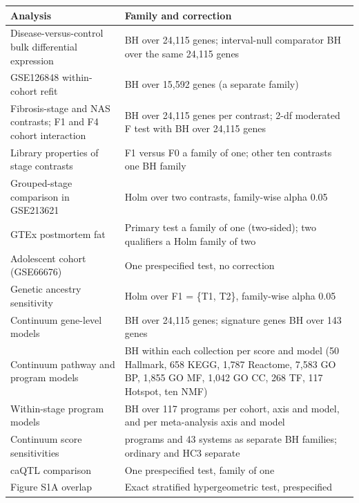 \begin{longtable}[]{@{}
  >{\raggedright\arraybackslash}p{}
  >{\raggedright\arraybackslash}p{}@{}}
\toprule\noalign{}
\begin{minipage}[b]{\linewidth}\raggedright
Analysis
\end{minipage} & \begin{minipage}[b]{\linewidth}\raggedright
Family and correction
\end{minipage} \\
\midrule\noalign{}
\endhead
\bottomrule\noalign{}
\endlastfoot
Disease-versus-control bulk differential expression & BH over 24,115 genes; interval-null comparator BH over the same 24,115 genes \\
GSE126848 within-cohort refit & BH over 15,592 genes (a separate family) \\
Fibrosis-stage and NAS contrasts; F1 and F4 cohort interaction & BH over 24,115 genes per contrast; 2-df moderated F test with BH over 24,115 genes \\
Library properties of stage contrasts & F1 versus F0 a family of one; other ten contrasts one BH family \\
Grouped-stage comparison in GSE213621 & Holm over two contrasts, family-wise alpha 0.05 \\
GTEx postmortem fat & Primary test a family of one (two-sided); two qualifiers a Holm family of two \\
Adolescent cohort (GSE66676) & One prespecified test, no correction \\
Genetic ancestry sensitivity & Holm over F1 = \{T1, T2\}, family-wise alpha 0.05 \\
Continuum gene-level models & BH over 24,115 genes; signature genes BH over 143 genes \\
Continuum pathway and program models & BH within each collection per score and model (50 Hallmark, 658 KEGG, 1,787 Reactome, 7,583 GO BP, 1,855 GO MF, 1,042 GO CC, 268 TF, 117 Hotspot, ten NMF) \\
Within-stage program models & BH over 117 programs per cohort, axis and model, and per meta-analysis axis and model \\
Continuum score sensitivities & 117 programs and 43 systems as separate BH families; ordinary and HC3 separate \\
caQTL comparison & One prespecified test, family of one \\
Figure S1A overlap & Exact stratified hypergeometric test, prespecified \\

\end{longtable}
